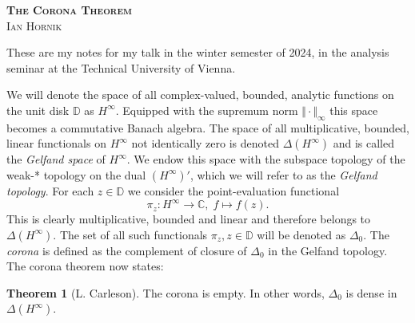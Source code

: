 \documentclass[letterpaper, 11pt]{article}
\newcommand{\C}{\mathbb{C}}
\newcommand{\D}{\mathbb{D}}
\newcommand{\1}{\mathds{1}}
\theoremstyle{definition}
\newtheorem{theorem}{Theorem}
\begin{document}
\author{\normalsize Ian Hornik}
\date{\vspace{-0.8em}\normalsize\today}


\begin{center}
  {\LARGE\scshape\bfseries{The Corona Theorem}} \\
  \scshape{Ian Hornik}
\end{center}

These are my notes for my talk in the winter semester of 2024, in the analysis seminar at the Technical University of Vienna.


We will denote the space of all complex-valued, bounded, analytic functions on the unit disk $\D$ as $H^\infty$. Equipped with the supremum norm $\Vert \cdot \Vert_\infty$ this space becomes a commutative Banach algebra. The space of all multiplicative, bounded, linear functionals on $H^\infty$ not identically zero is denoted $\Delta(H^\infty)$ and is called the \emph{Gelfand space} of $H^\infty$. We endow this space with the subspace topology of the weak\nobreakdash-* topology on the dual $(H^\infty)'$, which we will refer to as the \emph{Gelfand topology}. For each $z \in \D$ we consider the point-evaluation functional
\begin{equation*}
  \pi_z : H^\infty \to \C,\; f \mapsto f(z).
\end{equation*}
This is clearly multiplicative, bounded and linear and therefore belongs to $\Delta(H^\infty)$. The set of all such functionals $\pi_z, z \in \D$ will be denoted as $\Delta_0$. The \emph{corona} is defined as the complement of closure of $\Delta_0$ in the Gelfand topology. The corona theorem now states:

\begin{theorem}[L. Carleson] \label{thm:corona}
  The corona is empty. In other words, $\Delta_0$ is dense in $\Delta(H^\infty)$.
\end{theorem}
\end{document}
